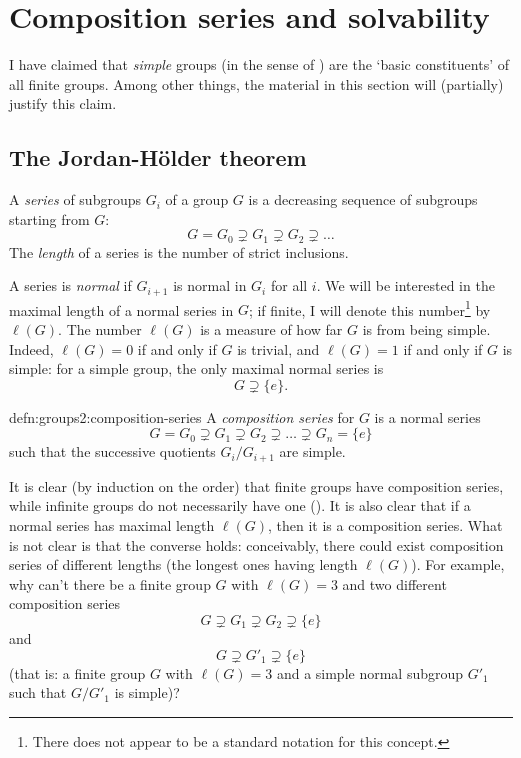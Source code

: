 \section{Composition series and solvability}
\label{sec:groups2:composition-series-and-solvability}


I have claimed that \emph{simple} groups (in the sense of
) are the `basic constituents' of all
finite groups. Among other things, the material in this section will
(partially) justify this claim.

\subsection{The Jordan-H\"older theorem}
\label{subsec:groups2:the-jordan-h-older-theorem}
A \emph{series} of subgroups $G_i$ of a group $G$ is a decreasing
sequence of subgroups starting from $G$:
\[
  G = G_0 \supsetneq G_1 \supsetneq G_2 \supsetneq \dots
\]
The \emph{length} of a series is the number of strict inclusions.

A series is \emph{normal} if $G_{i+1}$ is normal in $G_i$ for all
$i$. We will be interested in the maximal length of a normal series in
$G$; if finite, I will denote this number\footnote{There does not
  appear to be a standard notation for this concept.} by
$\ell(G)$. The number $\ell(G)$ is a measure of how far $G$ is from
being simple. Indeed, $\ell(G) = 0$ if and only if $G$ is trivial, and
$\ell(G) = 1$ if and only if $G$ is simple: for a simple group, the
only maximal normal series is
\[
  G \supsetneq \{e\}.
\]
\begin{defn}{}{defn:groups2:composition-series}
  A \emph{composition series} for $G$ is a normal series
  \[
    G = G_0 \supsetneq G_1 \supsetneq G_2 \supsetneq \dots \supsetneq
    G_n = \{e\}
  \]
  such that the successive quotients $G_i/G_{i+1}$ are simple.
\end{defn}
It is clear (by induction on the order) that finite groups have
composition series, while infinite groups do not necessarily have one
(). It
is also clear that if a normal series has maximal length $\ell(G)$,
then it is a composition series. What is not clear is that the
converse holds: conceivably, there could exist composition series of
different lengths (the longest ones having length $\ell(G)$). For
example, why can't there be a finite group $G$ with $\ell(G) = 3$ and
two different composition series
\[
  G \supsetneq G_1 \supsetneq G_2 \supsetneq \{e\}
\]
and
\[
  G \supsetneq G'_1 \supsetneq \{e\}
\]
(that is: a finite group $G$ with $\ell(G) = 3$ and a simple normal
subgroup $G'_1$ such that $G/G'_1$ is simple)?

